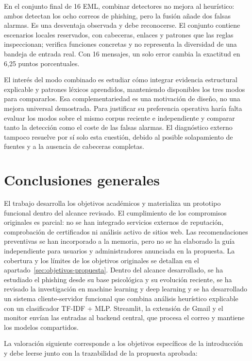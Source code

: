 \documentclass[11pt,a4paper,oneside]{report}
\begin{document}
En el conjunto final de 16 EML, combinar detectores no mejora al heurístico: ambos detectan los ocho correos de phishing, pero la fusión añade dos falsas alarmas. Es una desventaja observada y debe reconocerse. El conjunto contiene escenarios locales reservados, con cabeceras, enlaces y patrones que las reglas inspeccionan; verifica funciones concretas y no representa la diversidad de una bandeja de entrada real. Con 16 mensajes, un solo error cambia la exactitud en 6,25 puntos porcentuales.

El interés del modo combinado es estudiar cómo integrar evidencia estructural explicable y patrones léxicos aprendidos, manteniendo disponibles los tres modos para compararlos. Esa complementariedad es una motivación de diseño, no una mejora universal demostrada. Para justificar su preferencia operativa haría falta evaluar los modos sobre el mismo corpus reciente e independiente y comparar tanto la detección como el coste de las falsas alarmas. El diagnóstico externo tampoco resuelve por sí solo esta cuestión, debido al posible solapamiento de fuentes y a la ausencia de cabeceras completas.

\chapter{Conclusiones generales}

El trabajo desarrolla los objetivos académicos y materializa un prototipo funcional dentro del alcance revisado. El cumplimiento de los compromisos originales es parcial: no se han integrado servicios externos de reputación, comprobación de certificados ni análisis activo de sitios web. Las recomendaciones preventivas se han incorporado a la memoria, pero no se ha elaborado la guía independiente para usuarios y administradores anunciada en la propuesta. La cobertura y los límites de los objetivos originales se detallan en el apartado~\ref{sec:objetivos-propuesta}. Dentro del alcance desarrollado, se ha estudiado el phishing desde su base psicológica y su evolución reciente, se ha revisado la investigación en machine learning y deep learning y se ha desarrollado un sistema cliente-servidor funcional que combina análisis heurístico explicable con un clasificador TF-IDF + MLP. Streamlit, la extensión de Gmail y el monitor envían las entradas al backend central, que procesa el correo y mantiene los modelos compartidos.

La valoración siguiente corresponde a los objetivos específicos de la introducción y debe leerse junto con la trazabilidad de la propuesta aprobada:
\end{document}
